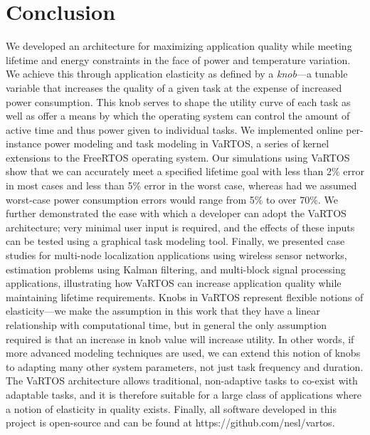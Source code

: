 \section{Conclusion}
\label{sec:conclusion}
We developed an architecture for maximizing application quality while meeting lifetime and energy constraints in the face of power and temperature variation. We achieve this through application elasticity as defined by a \emph{knob}---a tunable variable that increases the quality of a given task at the expense of increased power consumption.  This knob serves to shape the utility curve of each task as well as offer a means by which the operating system can control the amount of active time and thus power given to individual tasks. We implemented online per-instance power modeling and task modeling in VaRTOS, a series of kernel extensions to the FreeRTOS operating system.  Our simulations using VaRTOS show that we can accurately meet a specified lifetime goal with less than 2\% error in most cases and less than 5\% error in the worst case, whereas had we assumed worst-case power consumption errors would range from 5\% to over 70\%.  We further demonstrated the ease with which a developer can adopt the VaRTOS architecture; very minimal user input is required, and the effects of these inputs can be tested using a graphical task modeling tool.  Finally, we presented case studies for multi-node localization applications using wireless sensor networks, estimation problems using Kalman filtering, and multi-block signal processing applications, illustrating how VaRTOS can increase application quality while maintaining lifetime requirements.  Knobs in VaRTOS represent flexible notions of elasticity---we make the assumption in this work that they have a linear relationship with computational time, but in general the only assumption required is that an increase in knob value will increase utility.  In other words, if more advanced modeling techniques are used, we can extend this notion of knobs to adapting many other system parameters, not just task frequency and duration. The VaRTOS architecture allows traditional, non-adaptive tasks to co-exist with adaptable tasks, and it is therefore suitable for a large class of applications where a notion of elasticity in quality exists.  Finally, all software developed in this project is open-source and can be found at https://github.com/nesl/vartos. 